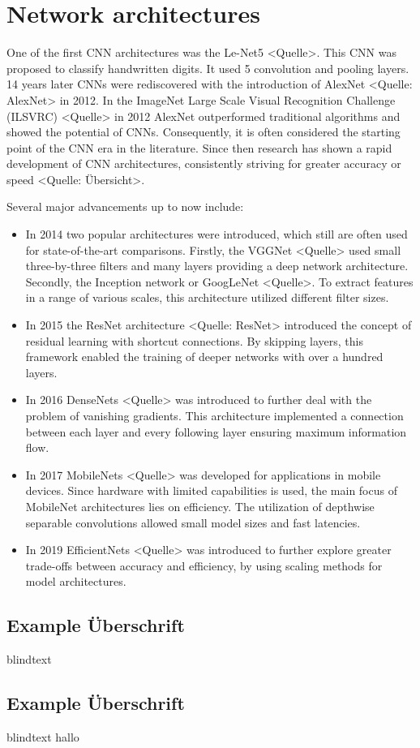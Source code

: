 \section{Network architectures}
\label{sec:networkArchitectures}

One of the first CNN architectures was the Le-Net5 <Quelle>.
This CNN was proposed to classify handwritten digits.
It used 5 convolution and pooling layers.
14 years later CNNs were rediscovered with the introduction of AlexNet <Quelle: AlexNet> in 2012.
In the ImageNet Large Scale Visual Recognition Challenge (ILSVRC) <Quelle> in 2012 AlexNet outperformed traditional algorithms and showed the potential of CNNs.
Consequently, it is often considered the starting point of the CNN era in the literature.
Since then research has shown a rapid development of CNN architectures, consistently striving for greater accuracy or speed <Quelle: Übersicht>.

\vspace{1cm} %

\noindent Several major advancements up to now include:

\begin{itemize}
    \item In 2014 two popular architectures were introduced, which still are often used for state-of-the-art comparisons. Firstly, the VGGNet <Quelle> used small three-by-three filters and many layers providing a deep network architecture. Secondly, the Inception network or GoogLeNet <Quelle>. To extract features in a range of various scales, this architecture utilized different filter sizes.
    \item In 2015 the ResNet architecture <Quelle: ResNet> introduced the concept of residual learning with shortcut connections. By skipping layers, this framework enabled the training of deeper networks with over a hundred layers.
    \item In 2016 DenseNets <Quelle> was introduced to further deal with the problem of vanishing gradients. This architecture implemented a connection between each layer and every following layer ensuring maximum information flow.
    \item In 2017 MobileNets <Quelle> was developed for applications in mobile devices. Since hardware with limited capabilities is used, the main focus of MobileNet architectures lies on efficiency. The utilization of depthwise separable convolutions allowed small model sizes and fast latencies.
    \item In 2019 EfficientNets <Quelle> was introduced to further explore greater trade-offs between accuracy and efficiency, by using scaling methods for model architectures. 
\end{itemize}

\subsection{Example Überschrift}

blindtext

\subsection{Example Überschrift}

blindtext hallo